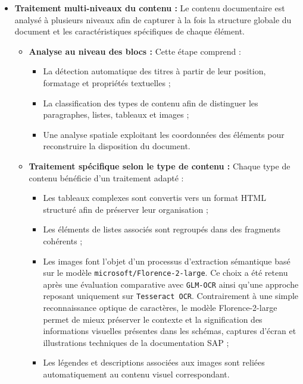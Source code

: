 \begin{itemize}[leftmargin=*, label=\textbullet]
  \item \textbf{Traitement multi-niveaux du contenu :}
  Le contenu documentaire est analysé à plusieurs niveaux afin de capturer à la fois la structure globale du document et les caractéristiques spécifiques de chaque élément.

  \begin{itemize}[leftmargin=2em, label=\textbullet]

    \item \textbf{Analyse au niveau des blocs :}
    Cette étape comprend :
    \begin{itemize}[leftmargin=3em, label={--}]
      \item La détection automatique des titres à partir de leur position, formatage et propriétés textuelles ;
      \item La classification des types de contenu afin de distinguer les paragraphes, listes, tableaux et images ;
      \item Une analyse spatiale exploitant les coordonnées des éléments pour reconstruire la disposition du document.
    \end{itemize}

    \item \textbf{Traitement spécifique selon le type de contenu :}
    Chaque type de contenu bénéficie d’un traitement adapté :
    \begin{itemize}[leftmargin=3em, label={--}]
      \item Les tableaux complexes sont convertis vers un format HTML structuré afin de préserver leur organisation ;
      \item Les éléments de listes associés sont regroupés dans des fragments cohérents ;
      \item Les images font l’objet d’un processus d’extraction sémantique basé sur le modèle \texttt{microsoft/Florence-2-large}. Ce choix a été retenu après une évaluation comparative avec \texttt{GLM-OCR} ainsi qu’une approche reposant uniquement sur \texttt{Tesseract OCR}. Contrairement à une simple reconnaissance optique de caractères, le modèle Florence-2-large permet de mieux préserver le contexte et la signification des informations visuelles présentes dans les schémas, captures d’écran et illustrations techniques de la documentation SAP ;
      \item Les légendes et descriptions associées aux images sont reliées automatiquement au contenu visuel correspondant.
    \end{itemize}

  \end{itemize}

\end{itemize}



